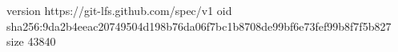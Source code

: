version https://git-lfs.github.com/spec/v1
oid sha256:9da2b4eeac20749504d198b76da06f7bc1b8708de99bf6e73fef99b8f7f5b827
size 43840
